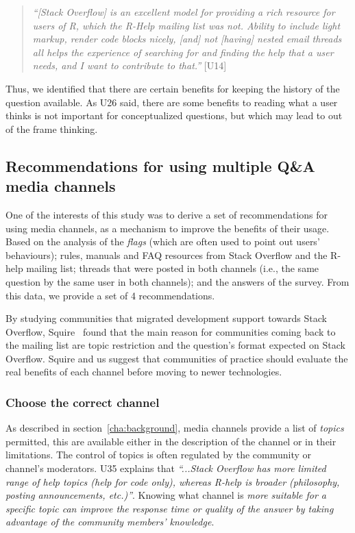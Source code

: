 \documentclass{sig-alternate-05-2015}
\begin{document}
    \begin{quote}
        \textit{``[Stack Overflow] is an excellent model for providing a rich resource for users of R, which the R-Help mailing list was not. 
        Ability to include light markup, render code blocks nicely, [and] not [having] nested email threads all helps the experience of searching for and finding the help that a user needs, and I want to contribute to that.''} [U14]
	\end{quote}

Thus, we identified that there are certain benefits for keeping the history of the question available.
As U26 said, there are some benefits to reading what a user thinks is not important for conceptualized questions, but which may lead to out of the frame thinking. 


\subsection{Recommendations for using multiple Q\&A media channels}

	One of the interests of this study was to derive a set of recommendations for using media channels, as a mechanism to improve the benefits of their usage.
	Based on the analysis of the \textit{flags} (which are often used to point out users' behaviours); rules, manuals and FAQ resources from Stack Overflow and the R-help mailing list; threads that were posted in both channels (i.e., the same question by the same user in both channels); and the answers of the survey.
	From this data, we provide a set of 4 recommendations.

By studying communities that migrated development support towards Stack Overflow, Squire~\cite{Squire2015a} found that the main reason for communities coming back to the mailing list are topic restriction and the question's format expected on Stack Overflow.
Squire and us suggest that communities of practice should evaluate the real benefits of each channel before moving to newer technologies.


	\subsubsection{Choose the correct channel}

		As described in section~\ref{cha:background}, media channels provide a list of \textit{topics} permitted, this are available either in the description of the channel or in their limitations.
		The control of topics is often regulated by the community or channel's moderators.
		U35 explains that \textit{``...Stack Overflow has more limited range of help topics (help for code only), whereas R-help is broader (philosophy, posting announcements, etc.)''}.
		Knowing what channel is \emph{more suitable for a specific topic can improve the response time or quality of the answer by taking advantage of the community members' knowledge}.
\end{document}
